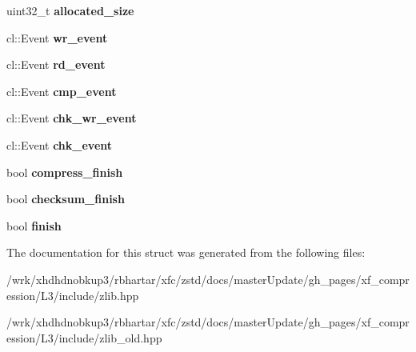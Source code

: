 \begin{DoxyCompactItemize}
\item 
\hypertarget{structxf_1_1compression_1_1buffers_ac616c2e506c9645444effb67c3b1a465}{uint32\-\_\-t {\bfseries allocated\-\_\-size}}\label{structxf_1_1compression_1_1buffers_ac616c2e506c9645444effb67c3b1a465}

\item 
\hypertarget{structxf_1_1compression_1_1buffers_a0ce3c454c580f2027e0796d454cd30e4}{cl\-::\-Event {\bfseries wr\-\_\-event}}\label{structxf_1_1compression_1_1buffers_a0ce3c454c580f2027e0796d454cd30e4}

\item 
\hypertarget{structxf_1_1compression_1_1buffers_a4fd659a33f8f0298605415dd42f92799}{cl\-::\-Event {\bfseries rd\-\_\-event}}\label{structxf_1_1compression_1_1buffers_a4fd659a33f8f0298605415dd42f92799}

\item 
\hypertarget{structxf_1_1compression_1_1buffers_ae2e6d8ae62559fc3084ec9183dd75e12}{cl\-::\-Event {\bfseries cmp\-\_\-event}}\label{structxf_1_1compression_1_1buffers_ae2e6d8ae62559fc3084ec9183dd75e12}

\item 
\hypertarget{structxf_1_1compression_1_1buffers_a1841f2e58b1dfcea72e10b1dc5760f21}{cl\-::\-Event {\bfseries chk\-\_\-wr\-\_\-event}}\label{structxf_1_1compression_1_1buffers_a1841f2e58b1dfcea72e10b1dc5760f21}

\item 
\hypertarget{structxf_1_1compression_1_1buffers_a7eb1c54115cc8f4a352fe55244dec57c}{cl\-::\-Event {\bfseries chk\-\_\-event}}\label{structxf_1_1compression_1_1buffers_a7eb1c54115cc8f4a352fe55244dec57c}

\item 
\hypertarget{structxf_1_1compression_1_1buffers_a2b6968d5742069499c3dfb2a6c931db7}{bool {\bfseries compress\-\_\-finish}}\label{structxf_1_1compression_1_1buffers_a2b6968d5742069499c3dfb2a6c931db7}

\item 
\hypertarget{structxf_1_1compression_1_1buffers_af665eca491f4948afb2f834a8905fcc4}{bool {\bfseries checksum\-\_\-finish}}\label{structxf_1_1compression_1_1buffers_af665eca491f4948afb2f834a8905fcc4}

\item 
\hypertarget{structxf_1_1compression_1_1buffers_a5f5e4499f838ed057ef5d9dd656c72a5}{bool {\bfseries finish}}\label{structxf_1_1compression_1_1buffers_a5f5e4499f838ed057ef5d9dd656c72a5}

\end{DoxyCompactItemize}


The documentation for this struct was generated from the following files\-:\begin{DoxyCompactItemize}
\item 
/wrk/xhdhdnobkup3/rbhartar/xfc/zstd/docs/master\-Update/gh\-\_\-pages/xf\-\_\-compression/\-L3/include/zlib.\-hpp\item 
/wrk/xhdhdnobkup3/rbhartar/xfc/zstd/docs/master\-Update/gh\-\_\-pages/xf\-\_\-compression/\-L3/include/zlib\-\_\-old.\-hpp\end{DoxyCompactItemize}
